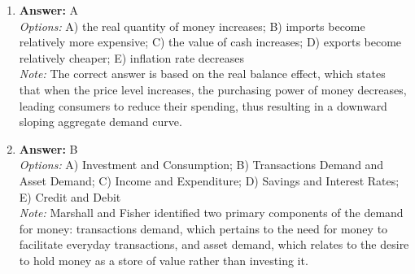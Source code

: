 \documentclass[12pt]{article}
\begin{document}
\begin{enumerate}[label=\arabic*.]
\item \textbf{Answer:} A
\\ \textit{Options:} A) the real quantity of money increases; B) imports become relatively more expensive; C) the value of cash increases; D) exports become relatively cheaper; E) inflation rate decreases
\\ \textit{Note:} The correct answer is based on the real balance effect, which states that when the price level increases, the purchasing power of money decreases, leading consumers to reduce their spending, thus resulting in a downward sloping aggregate demand curve.
\item \textbf{Answer:} B
\\ \textit{Options:} A) Investment and Consumption; B) Transactions Demand and Asset Demand; C) Income and Expenditure; D) Savings and Interest Rates; E) Credit and Debit
\\ \textit{Note:} Marshall and Fisher identified two primary components of the demand for money: transactions demand, which pertains to the need for money to facilitate everyday transactions, and asset demand, which relates to the desire to hold money as a store of value rather than investing it.
\end{enumerate}
\end{document}
